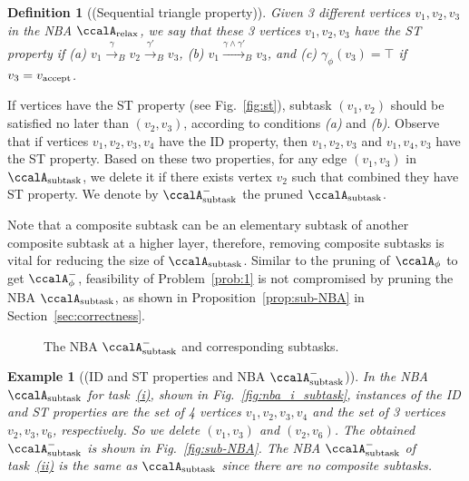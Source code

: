 \documentclass[Afour,sageh,times]{sagej}
\newtheorem{exmp}{Example}
\newtheorem{defn}[thm]{Definition}
\newcommand{\auto}[1]{\ccalA_{\textup{#1}}}
\newcommand{\autop}{\ccalA_{\phi}}
\newcommand{\vertex}[1]{v_{\textup{#1}}}
\newenvironment{cexmp}
{\addtocounter{exmp}{-1}\begin{exmp}}
  {\end{exmp}}
\begin{document}
\begin{defn}[(Sequential triangle property)]\label{defn:st}
  Given 3 different vertices $v_1, v_2, v_3$ in the NBA $\auto{relax}$, we say that these 3 vertices $v_1, v_2, v_3$ have the ST property if %
(a) $v_1 \xrightarrow{\gamma}_B v_2 \xrightarrow{\gamma'}_B v_3$,  (b) $v_1 \xrightarrow{\gamma \wedge \gamma'}_B v_3$, and (c) $\gamma_\phi(v_3) = \top$ if $v_3 = \vertex{accept}$.
\end{defn}

If vertices have the ST  property (see Fig.~\ref{fig:st}), subtask $(v_1, v_2)$ should be satisfied no later than $(v_2, v_3)$, according to conditions {\it (a)} and {\it (b)}. Observe that if vertices $v_1, v_2, v_3, v_4$ have the ID property, then $v_1, v_2, v_3$ and $v_1, v_4, v_3$ have the ST property. Based on these two properties, for any edge $(v_1, v_3)$ in $\auto{subtask}$, we delete it if there exists  vertex $v_2$ such that combined they have  ST property. We denote by $\auto{subtask}^-$ the pruned $\auto{subtask}$.

Note that a composite subtask can be an elementary subtask of another composite subtask at a higher layer, therefore, removing composite subtasks  is vital for reducing the size of $\auto{subtask}$. Similar to the pruning of $\autop$ to get $\autop^-$, feasibility of Problem~\ref{prob:1} is not compromised by pruning the NBA $\auto{subtask}$, as shown in Proposition~\ref{prop:sub-NBA} in Section~\ref{sec:correctness}. %
\begin{figure}[t]
    \centering
    \subfigure[$\auto{subtask}^-$]{
      \label{fig:sub-NBA}
      \texttt{[image: nba\_i\_subtask\_prune.pdf]}}
    \hspace{2em}
        \caption{The NBA $\auto{subtask}^-$ and corresponding subtasks.} \label{fig:subtask_prune}
\end{figure}
\begin{cexmp} [(ID and ST properties and NBA $\auto{subtask}^-$)]
  In the NBA $\auto{subtask}$ for task~\hyperref[task:i]{\it (i)}, shown in Fig.~\ref{fig:nba_i_subtask}, instances of the ID and ST properties are the set of 4 vertices $v_1, v_2, v_3, v_4$ and the set of 3 vertices $v_2, v_3, v_6$, respectively. So we delete $(v_1, v_3)$ and $(v_2, v_6)$. The obtained $\auto{subtask}^-$ is shown in Fig.~\ref{fig:sub-NBA}. The NBA $\auto{subtask}^-$ of task~\hyperref[task:ii]{\it (ii)} is the same as $\auto{subtask}$ since there are no composite subtasks.
\end{cexmp}
\end{document}
